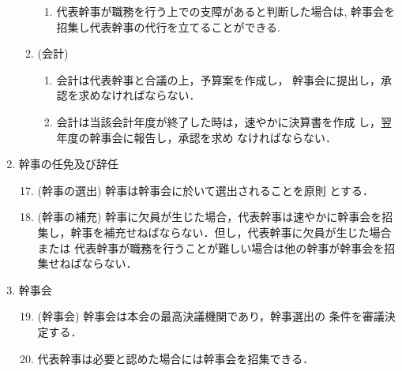 \begin{enumerate}
\begin{enumerate}
\begin{enumerate}
	\item	代表幹事が職務を行う上での支障があると判断した場合は,
幹事会を招集し代表幹事の代行を立てることができる. \\
\end{enumerate}
%
\item	(会計)
\begin{enumerate}
	\item	会計は代表幹事と合議の上，予算案を作成し，
				幹事会に提出し，承認を求めなければならない．\\
	\item	会計は当該会計年度が終了した時は，速やかに決算書を作成
				し，翌年度の幹事会に報告し，承認を求め
なければならない．\\
\end{enumerate}
%
\end{enumerate}
%
\newpage
\item	幹事の任免及び辞任\\
%
\begin{enumerate}
\setcounter{enumii}{16}
\item	(幹事の選出) 幹事は幹事会に於いて選出されることを原則
				とする．\\
%
\item (幹事の補充) 幹事に欠員が生じた場合，代表幹事は速やかに幹事会を招
集し，幹事を補充せねばならない．但し，代表幹事に欠員が生じた場合または
代表幹事が職務を行うことが難しい場合は他の幹事が幹事会を招集せねばならない．\\
\end{enumerate}
%
\item    幹事会\\
%
\begin{enumerate}
\setcounter{enumii}{18}
\item    (幹事会) 幹事会は本会の最高決議機関であり，幹事選出の
                条件を審議決定する．\\
%
\item	代表幹事は必要と認めた場合には幹事会を招集できる．\\

\end{enumerate}
\end{enumerate}
